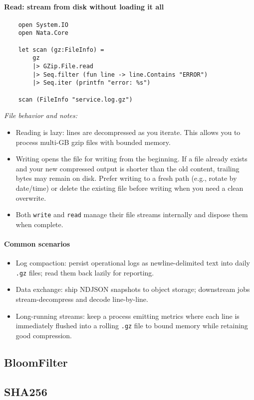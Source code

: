 \documentclass{article}
\begin{document}
\paragraph{Read: stream from disk without loading it all}
\begin{verbatim}
    open System.IO
    open Nata.Core

    let scan (gz:FileInfo) =
        gz
        |> GZip.File.read
        |> Seq.filter (fun line -> line.Contains "ERROR")
        |> Seq.iter (printfn "error: %s")

    scan (FileInfo "service.log.gz")
\end{verbatim}

\emph{File behavior and notes:}
\begin{itemize}
  \item Reading is lazy: lines are decompressed as you iterate. This allows you to process multi-GB gzip files with bounded memory.
  \item Writing opens the file for writing from the beginning. If a file already exists and your new compressed output is shorter than the old content, trailing bytes may remain on disk. Prefer writing to a fresh path (e.g., rotate by date/time) or delete the existing file before writing when you need a clean overwrite.
  \item Both \texttt{write} and \texttt{read} manage their file streams internally and dispose them when complete.
\end{itemize}

\paragraph{Common scenarios}
\begin{itemize}
  \item Log compaction: persist operational logs as newline-delimited text into daily \texttt{.gz} files; read them back lazily for reporting.
  \item Data exchange: ship NDJSON snapshots to object storage; downstream jobs stream-decompress and decode line-by-line.
  \item Long-running streams: keep a process emitting metrics where each line is immediately flushed into a rolling \texttt{.gz} file to bound memory while retaining good compression.
\end{itemize}

\subsection{BloomFilter}

\subsection{SHA256}


\clearpage
\appendix
\end{document}
